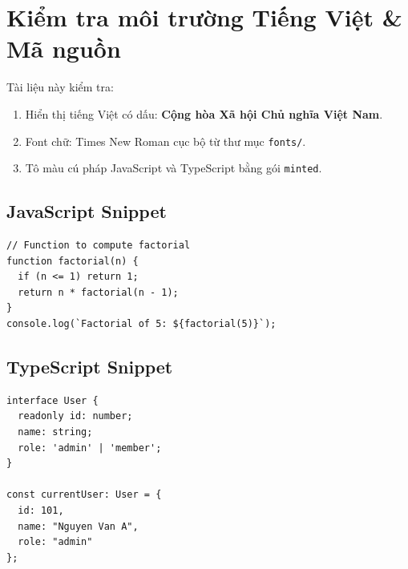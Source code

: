 \documentclass[a4paper,12pt]{article}
\begin{document}
\section*{Kiểm tra môi trường Tiếng Việt \& Mã nguồn}

Tài liệu này kiểm tra:
\begin{enumerate}
    \item Hiển thị tiếng Việt có dấu: \textbf{Cộng hòa Xã hội Chủ nghĩa Việt Nam}.
    \item Font chữ: Times New Roman cục bộ từ thư mục \texttt{fonts/}.
    \item Tô màu cú pháp JavaScript và TypeScript bằng gói \texttt{minted}.
\end{enumerate}

\subsection*{JavaScript Snippet}
\begin{verbatim}
// Function to compute factorial
function factorial(n) {
  if (n <= 1) return 1;
  return n * factorial(n - 1);
}
console.log(`Factorial of 5: ${factorial(5)}`);
\end{verbatim}

\subsection*{TypeScript Snippet}
\begin{verbatim}
interface User {
  readonly id: number;
  name: string;
  role: 'admin' | 'member';
}

const currentUser: User = {
  id: 101,
  name: "Nguyen Van A",
  role: "admin"
};
\end{verbatim}
\end{document}
